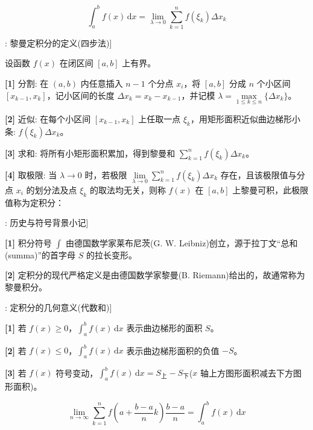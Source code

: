 \documentclass[11pt,a4paper,UTF8]{ctexart}
\begin{document}
\begin{equation*}
\int_a^b f(x)\,\mathrm{d}x = \lim_{\lambda \to 0} \sum_{k=1}^n f(\xi_k)\Delta x_k
\end{equation*}
\begin{thmbox}[概念[1]: 黎曼定积分的定义(四步法)]

设函数 $f(x)$ 在闭区间 $[a, b]$ 上有界。

\textbf{[1]} 分割: 在 $(a, b)$ 内任意插入 $n-1$ 个分点 $x_i$，将 $[a, b]$ 分成 $n$ 个小区间 $[x_{k-1}, x_k]$，记小区间的长度 $\Delta x_k = x_k - x_{k-1}$，并记模 $\lambda = \max\limits_{1 \leqslant k \leqslant n} \{\Delta x_k\}$。

\textbf{[2]} 近似: 在每个小区间 $[x_{k-1}, x_k]$ 上任取一点 $\xi_k$，用矩形面积近似曲边梯形小条: $f(\xi_k)\Delta x_k$。

\textbf{[3]} 求和: 将所有小矩形面积累加，得到黎曼和 $\sum\limits_{k=1}^n f(\xi_k)\Delta x_k$。

\textbf{[4]} 取极限: 当 $\lambda \to 0$ 时，若极限 $\lim\limits_{\lambda \to 0} \sum\limits_{k=1}^n f(\xi_k)\Delta x_k$ 存在，且该极限值与分点 $x_i$ 的划分法及点 $\xi_k$ 的取法均无关，则称 $f(x)$ 在 $[a, b]$ 上黎曼可积，此极限值称为定积分：


\end{thmbox}
\begin{thmbox}[原理[1]: 历史与符号背景小记]

\textbf{[1]} 积分符号 $\int$ 由德国数学家莱布尼茨(G. W. Leibniz)创立，源于拉丁文“总和(summa)”的首字母 $S$ 的拉长变形。

\textbf{[2]} 定积分的现代严格定义是由德国数学家黎曼(B. Riemann)给出的，故通常称为黎曼积分。

\end{thmbox}
\begin{thmbox}[原理[2]: 定积分的几何意义(代数和)]

\textbf{[1]} 若 $f(x) \geqslant 0$，$\int_a^b f(x)\,\mathrm{d}x$ 表示曲边梯形的面积 $S$。

\textbf{[2]} 若 $f(x) \leqslant 0$，$\int_a^b f(x)\,\mathrm{d}x$ 表示曲边梯形面积的负值 $-S$。

\textbf{[3]} 若 $f(x)$ 符号变动，$\int_a^b f(x)\,\mathrm{d}x = S_{\text{上}} - S_{\text{下}}$($x$ 轴上方图形面积减去下方图形面积)。

\end{thmbox}

\begin{equation*}
\lim_{n \to \infty} \sum_{k=1}^n f\left(a + \frac{b-a}{n}k\right)\frac{b-a}{n} = \int_a^b f(x)\,\mathrm{d}x
\end{equation*}
\end{document}

